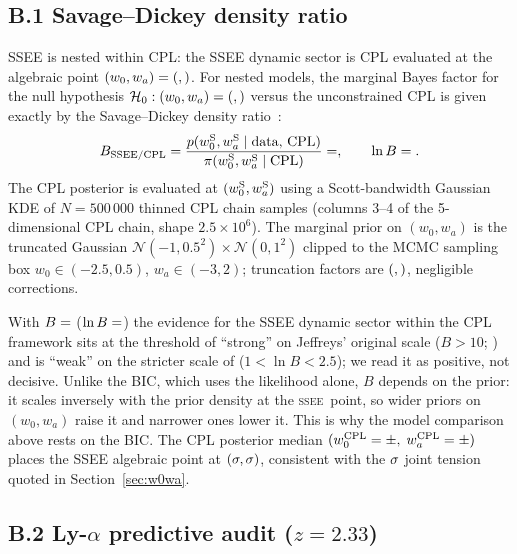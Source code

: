 \documentclass[12pt,a4paper]{article}
\newcommand{\SSEE}{\ifmmode\mathrm{SSEE}\else\textsc{ssee}\fi}
\begin{document}
\subsection*{B.1 Savage--Dickey density ratio}

SSEE is nested within CPL: the SSEE dynamic sector is CPL evaluated at
the algebraic point $(w_0,w_a)=(\val{W0_d3},\val{WA_d3})$.  For nested models,
the marginal Bayes factor for the null hypothesis $\mathcal{H}_0:
(w_0,w_a)=(\val{W0_d3},\val{WA_d3})$ versus the unconstrained CPL is given
exactly by the Savage--Dickey density
ratio~\cite{Verdinelli1995,Trotta2008}:
\begin{equation}
  B_{\rm SSEE/CPL} = \frac{p(w_0^{\rm S},w_a^{\rm S}\mid\text{data, CPL})}
                          {\pi(w_0^{\rm S},w_a^{\rm S}\mid\text{CPL})}
                   = \val{p2_B_sddr}, \qquad \ln B = \val{p2_lnB_signo}.
\end{equation}
The CPL posterior is evaluated at $(w_0^{\rm S},w_a^{\rm S})$ using a
Scott-bandwidth Gaussian KDE of $N=500\,000$ thinned CPL chain samples
(columns 3--4 of the 5-dimensional CPL chain, shape $2.5\times10^6$).
The marginal prior on $(w_0,w_a)$ is the truncated Gaussian
$\mathcal{N}(-1,0.5^2)\times\mathcal{N}(0,1^2)$ clipped to the MCMC
sampling box $w_0\in(-2.5,0.5)$, $w_a\in(-3,2)$; truncation factors
are $(\val{sd_ztrunc_w0},\val{sd_ztrunc_wa})$, negligible corrections.

With $B=\val{p2_B_sddr}$ ($\ln B=\val{p2_lnB_signo}$) the evidence for the SSEE dynamic sector
within the CPL framework sits at the threshold of ``strong'' on Jeffreys' original
scale ($B>10$; \citealt{Jeffreys1961}) and is ``weak'' on the stricter scale of
\citet{Trotta2008} ($1<\ln B<2.5$); we read it as positive, not decisive. Unlike the BIC, which uses the likelihood alone, $B$ depends on
the prior: it scales inversely with the prior density at the \SSEE\ point, so wider priors on $(w_0,w_a)$
raise it and narrower ones lower it. This is why the model comparison above rests on the BIC.  The CPL posterior median
$(w_0^{\rm CPL}=\val{p2_cpl_w0_mediana}\pm\val{p2_cpl_w0_std},\;w_a^{\rm CPL}=\val{p2_cpl_wa_mediana}\pm\val{p2_cpl_wa_std})$ places
the SSEE algebraic point at $(\val{p2_dist_w0}\sigma,\val{p2_dist_wa}\sigma)$, consistent with
the $\val{p2_w0wa_ssee_ec26}\sigma$ joint tension quoted in Section~\ref{sec:w0wa}.

\subsection*{B.2 Ly-$\alpha$ predictive audit ($z=2.33$)}
\label{app:lya}
\end{document}
